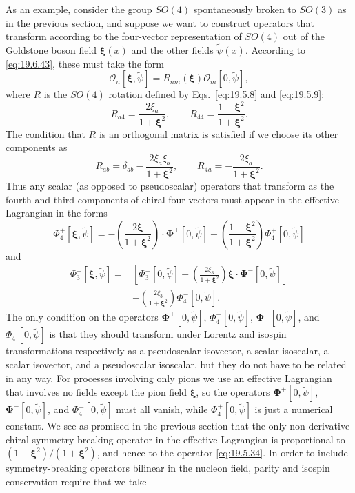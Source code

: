 As an example, consider the group $SO(4)$ spontaneously broken to $SO(3)$ as in the previous section, and suppose we want to construct operators that transform according to the four-vector representation of $SO(4)$ out of the Goldstone boson field $\boldsymbol\xi(x)$ and the other fields $\widetilde\psi(x)$. According to \eqref{eq:19.6.43}, these must take the form
\[
\mathcal O_n[\boldsymbol\xi,\widetilde\psi]
=R_{nm}(\boldsymbol\xi)\mathcal O_m[0,\widetilde\psi],
\]
where $R$ is the $SO(4)$ rotation defined by Eqs.~\eqref{eq:19.5.8} and \eqref{eq:19.5.9}:
\[
R_{a4}=\frac{2\xi_a}{1+\boldsymbol\xi^2},
\qquad
R_{44}=\frac{1-\boldsymbol\xi^2}{1+\boldsymbol\xi^2}.
\]
The condition that $R$ is an orthogonal matrix is satisfied if we choose its other components as
\[
R_{ab}=\delta_{ab}
-\frac{2\xi_a\xi_b}{1+\boldsymbol\xi^2},
\qquad
R_{4a}=-\frac{2\xi_a}{1+\boldsymbol\xi^2}.
\]
Thus any scalar (as opposed to pseudoscalar) operators that transform as the fourth and third components of chiral four-vectors must appear in the effective Lagrangian in the forms
\[
\Phi_4^+[\boldsymbol\xi,\widetilde\psi]
=-\left(\frac{2\boldsymbol\xi}{1+\boldsymbol\xi^2}\right)
\cdot\boldsymbol\Phi^+[0,\widetilde\psi]
+\left(\frac{1-\boldsymbol\xi^2}{1+\boldsymbol\xi^2}\right)
\Phi_4^+[0,\widetilde\psi]
\]
and
\[
\begin{aligned}
\Phi_3^-[\boldsymbol\xi,\widetilde\psi]
={}&\left[
\Phi_3^-[0,\widetilde\psi]
-\left(\frac{2\xi_3}{1+\boldsymbol\xi^2}\right)
\boldsymbol\xi\cdot\boldsymbol\Phi^-[0,\widetilde\psi]
\right]
\\
&+\left(\frac{2\xi_3}{1+\boldsymbol\xi^2}\right)
\Phi_4^-[0,\widetilde\psi].
\end{aligned}
\]
The only condition on the operators $\boldsymbol\Phi^+[0,\widetilde\psi]$, $\Phi_4^+[0,\widetilde\psi]$, $\boldsymbol\Phi^-[0,\widetilde\psi]$, and $\Phi_4^-[0,\widetilde\psi]$ is that they should transform under Lorentz and isospin transformations respectively as a pseudoscalar isovector, a scalar isoscalar, a scalar isovector, and a pseudoscalar isoscalar, but they do not have to be related in any way. For processes involving only pions we use an effective Lagrangian that involves no fields except the pion field $\boldsymbol\xi$, so the operators $\boldsymbol\Phi^+[0,\widetilde\psi]$, $\boldsymbol\Phi^-[0,\widetilde\psi]$, and $\Phi_4^-[0,\widetilde\psi]$ must all vanish, while $\Phi_4^+[0,\widetilde\psi]$ is just a numerical constant. We see as promised in the previous section that the only non-derivative chiral symmetry breaking operator in the effective Lagrangian is proportional to $(1-\boldsymbol\xi^2)/(1+\boldsymbol\xi^2)$, and hence to the operator \eqref{eq:19.5.34}. In order to include symmetry-breaking operators bilinear in the nucleon field, parity and isospin conservation require that we take
